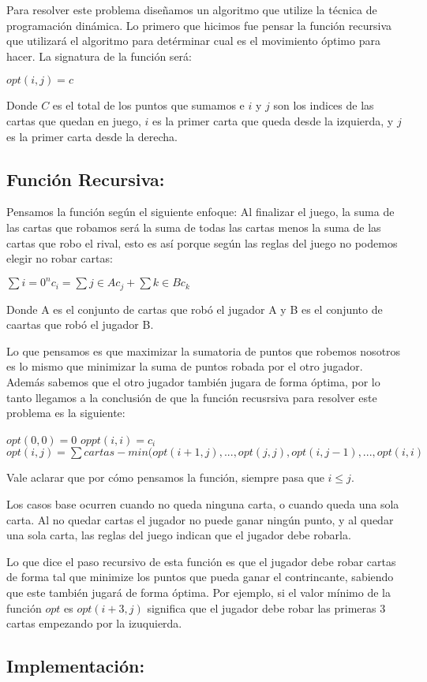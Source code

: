 Para resolver este problema diseñamos un algoritmo que utilize la técnica de programación dinámica. Lo primero que hicimos fue pensar la función recursiva que utilizará el algoritmo para detérminar cual es el movimiento óptimo para hacer. La signatura de la función será:

$opt(i,j) = c$

Donde $C$ es el total de los puntos que sumamos e $i$ y $j$ son los indices de las cartas que quedan en juego, $i$ es la primer carta que queda desde la izquierda, y $j$ es la primer carta desde la derecha.

\subsection{Función Recursiva:}

Pensamos la función según el siguiente enfoque: Al finalizar el juego, la suma de las cartas que robamos será la suma de todas las cartas menos la suma de las cartas que robo el rival, esto es así porque según las reglas del juego no podemos elegir no robar cartas:

$\sum{i=0}^{n} c_i = \sum{j \in A} c_j + \sum{k \in B} c_k$

Donde A es el conjunto de cartas que robó el jugador A y B es el conjunto de caartas que robó el jugador B.

Lo que pensamos es que maximizar la sumatoria de puntos que robemos nosotros es lo mismo que minimizar la suma de puntos robada por el otro jugador. Además sabemos que el otro jugador también jugara de forma óptima, por lo tanto llegamos a la conclusión de que la función recusrsiva para resolver este problema es la siguiente:

$opt(0,0) = 0$
$oppt(i,i) = c_i$
$opt(i,j) = \sum cartas - min(opt(i+1, j), ..., opt(j,j), opt(i, j-1), ... ,opt(i,i)$

Vale aclarar que por cómo pensamos la función, siempre pasa que $i \leq j$.

Los casos base ocurren cuando no queda ninguna carta, o cuando queda una sola carta. Al no quedar cartas el jugador no puede ganar ningún punto, y al quedar una sola carta, las reglas del juego indican que el jugador debe robarla.

Lo que dice el paso recursivo de esta función es que el jugador debe robar cartas de forma tal que minimize los puntos que pueda ganar el contrincante, sabiendo que este también jugará de forma óptima. Por ejemplo, si el valor mínimo de la función $opt$ es $opt(i+3,j)$ significa que el jugador debe robar las primeras 3 cartas empezando por la izuquierda.

\subsection{Implementación:}